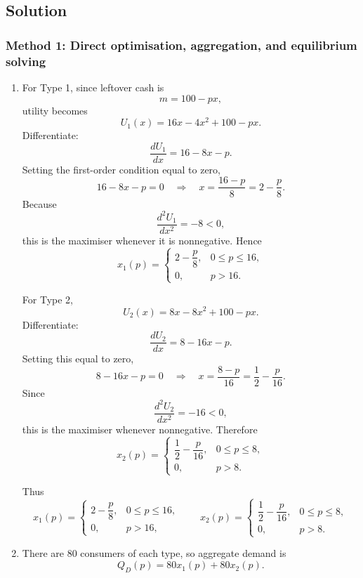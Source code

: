 \documentclass[12pt]{article}
\begin{document}
\newpage
\subsection{Solution}

\subsubsection{Method 1: Direct optimisation, aggregation, and equilibrium solving}

\begin{enumerate}[label=(\alph*)]
    \item
    For Type 1, since leftover cash is
    \[
    m=100-px,
    \]
    utility becomes
    \[
    U_1(x)=16x-4x^2+100-px.
    \]
    Differentiate:
    \[
    \frac{dU_1}{dx}=16-8x-p.
    \]
    Setting the first-order condition equal to zero,
    \[
    16-8x-p=0
    \quad\Longrightarrow\quad
    x=\frac{16-p}{8}=2-\frac{p}{8}.
    \]
    Because
    \[
    \frac{d^2U_1}{dx^2}=-8<0,
    \]
    this is the maximiser whenever it is nonnegative. Hence
    \[
    x_1(p)=
    \begin{cases}
    2-\dfrac{p}{8}, & 0\le p\le 16,\\[0.6em]
    0, & p>16.
    \end{cases}
    \]

    For Type 2,
    \[
    U_2(x)=8x-8x^2+100-px.
    \]
    Differentiate:
    \[
    \frac{dU_2}{dx}=8-16x-p.
    \]
    Setting this equal to zero,
    \[
    8-16x-p=0
    \quad\Longrightarrow\quad
    x=\frac{8-p}{16}=\frac12-\frac{p}{16}.
    \]
    Since
    \[
    \frac{d^2U_2}{dx^2}=-16<0,
    \]
    this is the maximiser whenever nonnegative. Therefore
    \[
    x_2(p)=
    \begin{cases}
    \dfrac12-\dfrac{p}{16}, & 0\le p\le 8,\\[0.6em]
    0, & p>8.
    \end{cases}
    \]

    Thus
    \[
    \boxed{
    x_1(p)=
    \begin{cases}
    2-\dfrac{p}{8}, & 0\le p\le 16,\\[0.5em]
    0, & p>16,
    \end{cases}
    \qquad
    x_2(p)=
    \begin{cases}
    \dfrac12-\dfrac{p}{16}, & 0\le p\le 8,\\[0.5em]
    0, & p>8.
    \end{cases}}
    \]

    \item
    There are 80 consumers of each type, so aggregate demand is
    \[
    Q_D(p)=80x_1(p)+80x_2(p).
    \]


\end{enumerate}
\end{document}
